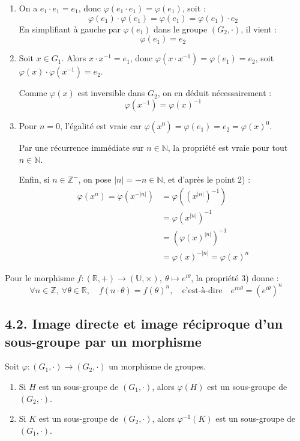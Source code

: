\documentclass[a4paper,11pt]{article}
\newcommand{\R}{\mathbb{R}}
\newcommand{\N}{\mathbb{N}}
\newcommand{\Z}{\mathbb{Z}}
\newcommand{\U}{\mathbb{U}}
\begin{document}
\begin{demonstration}
\begin{enumerate}
  \item On a $e_1 \cdot e_1 = e_1$, donc $\varphi(e_1 \cdot e_1) = \varphi(e_1)$, soit :
  \[
  \varphi(e_1) \cdot \varphi(e_1) = \varphi(e_1) = \varphi(e_1) \cdot e_2
  \]
  En simplifiant à gauche par $\varphi(e_1)$ dans le groupe $(G_2, \cdot)$, il vient :
  \[
  \varphi(e_1) = e_2
  \]
  \item Soit $x \in G_1$. Alors $x \cdot x^{-1} = e_1$, donc $\varphi(x \cdot x^{-1}) = \varphi(e_1) = e_2$, soit $\varphi(x) \cdot \varphi(x^{-1}) = e_2$.
  
  Comme $\varphi(x)$ est inversible dans $G_2$, on en déduit nécessairement :
  \[
  \varphi(x^{-1}) = \varphi(x)^{-1}
  \]
  \item Pour $n = 0$, l'égalité est vraie car $\varphi(x^0) = \varphi(e_1) = e_2 = \varphi(x)^0$.
  
  Par une récurrence immédiate sur $n \in \N$, la propriété est vraie pour tout $n \in \N$.
  
  Enfin, si $n \in \Z^-$, on pose $|n| = -n \in \N$, et d'après le point 2) :
  \begin{align*}
  \varphi(x^n) = \varphi(x^{-|n|}) &= \varphi\left((x^{|n|})^{-1}\right) \\
  &= \varphi(x^{|n|})^{-1} \\
  &= \left(\varphi(x)^{|n|}\right)^{-1} \\
  &= \varphi(x)^{-|n|} = \varphi(x)^n
  \end{align*}
\end{enumerate}
\end{demonstration}

\begin{exemples}
Pour le morphisme $f : (\R, +) \to (\U, \times), \ \theta \mapsto e^{i\theta}$, la propriété 3) donne :
\[
\forall n \in \Z, \ \forall \theta \in \R, \quad f(n \cdot \theta) = f(\theta)^n, \quad \text{c'est-à-dire} \quad e^{in\theta} = \left(e^{i\theta}\right)^n
\]
\end{exemples}

\newpage
\subsection{4.2. Image directe et image réciproque d'un sous-groupe par un morphisme}

\begin{proposition}
Soit $\varphi : (G_1, \cdot) \to (G_2, \cdot)$ un morphisme de groupes.
\begin{enumerate}
  \item Si $H$ est un sous-groupe de $(G_1, \cdot)$, alors $\varphi(H)$ est un sous-groupe de $(G_2, \cdot)$.
  \item Si $K$ est un sous-groupe de $(G_2, \cdot)$, alors $\varphi^{-1}(K)$ est un sous-groupe de $(G_1, \cdot)$.
\end{enumerate}
\end{proposition}
\end{document}
